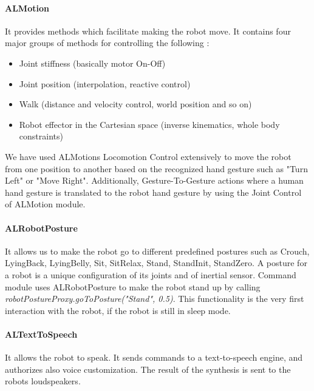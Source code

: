 \paragraph*{ALMotion} It provides methods which facilitate making the robot move. It contains four major groups of methods for controlling the following :
\begin{itemize}
	\item Joint stiffness (basically motor On-Off) 
	\item Joint position (interpolation, reactive control) 
	\item Walk (distance and velocity control, world position and so on) 
	\item Robot effector in the Cartesian space (inverse kinematics, whole body constraints) 
\end{itemize}

We have used ALMotions Locomotion Control extensively to move the robot from one position to another based on the recognized hand gesture such as "Turn Left" or "Move Right". Additionally, Gesture-To-Gesture actions where a human hand gesture is translated to the robot hand gesture by using the Joint Control of ALMotion module.

\paragraph*{ALRobotPosture} It allows us to make the robot go to different predefined postures such as Crouch, LyingBack, LyingBelly, Sit, SitRelax, Stand, StandInit, StandZero. A posture for a robot is a unique configuration of its joints and of inertial sensor. Command module uses ALRobotPosture to make the robot stand up by calling\textit{ robotPostureProxy.goToPosture("Stand", 0.5)}. This functionality is the very first interaction with the robot, if the robot is still in sleep mode. 

\paragraph*{ALTextToSpeech} It allows the robot to speak. It sends commands to a text-to-speech engine, and authorizes also voice customization. The result of the synthesis is sent to the robots loudspeakers. 
